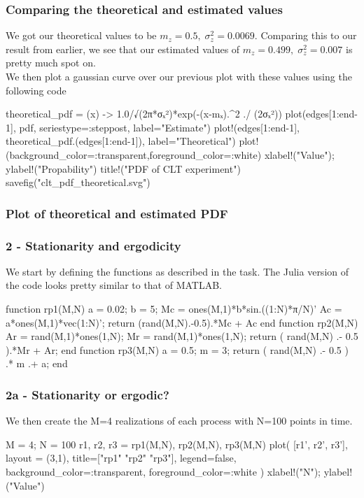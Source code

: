 \documentclass[compress]{beamer}
\begin{document}
\begin{frame}[fragile]
    \frametitle{Comparing the theoretical and estimated values}
    We got our theoretical values to be $m_z=0.5,\; \sigma_z^2=0.0069$.
    Comparing this to our result from earlier, we see that our estimated
    values of $m_z=0.499,\; \sigma_z^2=0.007$ is pretty much spot on. \\
    \medskip
    We then plot a gaussian curve over our previous plot with these values
    using the following code
    \begin{jllisting}[gobble=8]
        theoretical_pdf = (x) -> 1.0/√(2π*σₓ²)*exp(-(x-mₓ).^2 ./ (2σₓ²))
        plot(edges[1:end-1], pdf, seriestype=:steppost, label="Estimate")
        plot!(edges[1:end-1], theoretical_pdf.(edges[1:end-1]), label="Theoretical")
        plot!(background_color=:transparent,foreground_color=:white)
        xlabel!("Value"); ylabel!("Propability")
        title!("PDF of CLT experiment")
        savefig("clt_pdf_theoretical.svg")
    \end{jllisting}
\end{frame}

\begin{frame}
    \frametitle{Plot of theoretical and estimated PDF}
    \begin{figure}
        
    \end{figure}
\end{frame}

\begin{frame}[fragile]
    \frametitle{2 - Stationarity and ergodicity}
    \pause
    We start by defining the functions as described in the task. The Julia
    version of the code looks pretty similar to that of MATLAB.
    \begin{jllisting}[gobble=8]
        function rp1(M,N)
            a = 0.02; b = 5;
            Mc = ones(M,1)*b*sin.((1:N)*π/N)'
            Ac = a*ones(M,1)*vec(1:N)';
            return (rand(M,N).-0.5).*Mc + Ac
        end
        function rp2(M,N)
            Ar = rand(M,1)*ones(1,N);
            Mr = rand(M,1)*ones(1,N); 
            return ( rand(M,N) .- 0.5 ).*Mr + Ar;
        end
        function rp3(M,N)
            a = 0.5; m = 3;
            return ( rand(M,N) .- 0.5 ) .* m .+ a;
        end
    \end{jllisting}
\end{frame}
 
\begin{frame}[fragile]
    \frametitle{2a - Stationarity or ergodic?}
    We then create the M=4 realizations of each process with N=100 points
    in time.
    \begin{jllisting}[gobble=8]
        M = 4; N = 100
        r1, r2, r3 = rp1(M,N), rp2(M,N), rp3(M,N)
        plot(
            [r1', r2', r3'], layout = (3,1), 
            title=["rp1" "rp2" "rp3"], legend=false,
            background_color=:transparent,
            foreground_color=:white
        )
        xlabel!("N"); ylabel!("Value")
    \end{jllisting}
\end{frame}
\end{document}
